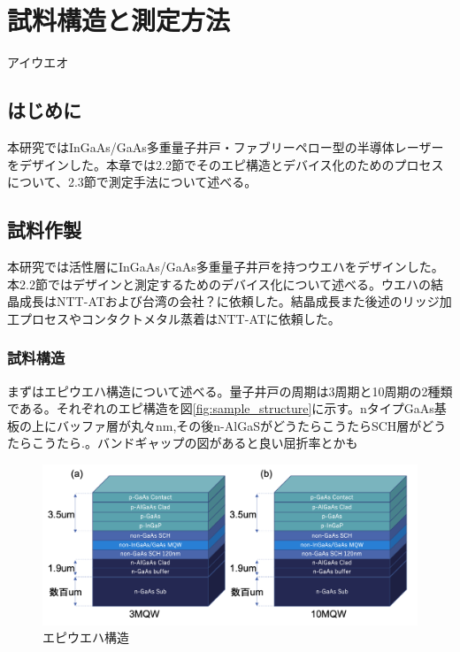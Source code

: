 
\chapter{試料構造と測定方法}%
アイウエオ

\section{はじめに}%
本研究ではInGaAs/GaAs多重量子井戸・ファブリーペロー型の半導体レーザーをデザインした。本章では2.2節でそのエピ構造とデバイス化のためのプロセスについて、2.3節で測定手法について述べる。
\section{試料作製}%
本研究では活性層にInGaAs/GaAs多重量子井戸を持つウエハをデザインした。本2.2節ではデザインと測定するためのデバイス化について述べる。ウエハの結晶成長はNTT-ATおよび台湾の会社？に依頼した。結晶成長また後述のリッジ加工プロセスやコンタクトメタル蒸着はNTT-ATに依頼した。

\subsection{試料構造}%
まずはエピウエハ構造について述べる。量子井戸の周期は3周期と10周期の2種類である。それぞれのエピ構造を図\ref{fig:sample_structure}に示す。nタイプGaAs基板の上にバッファ層が丸々nm,その後n-AlGaSがどうたらこうたらSCH層がどうたらこうたら.。バンドギャップの図があると良い屈折率とかも
\begin{figure}[t]
	\centering
	\includegraphics[width=15cm]{figure/fig_2_1_sample_structure}
	\caption{エピウエハ構造}
	\label{fig_2_1_sample_structure}
\end{figure}

